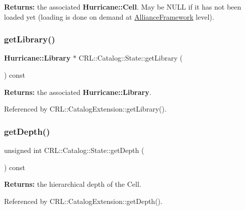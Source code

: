 {\bfseries Returns\+:} the associated \textbf{ Hurricane\+::\+Cell}. May be N\+U\+LL if it has not been loaded yet (loading is done on demand at \mbox{\hyperlink{classCRL_1_1AllianceFramework}{Alliance\+Framework}} level). \mbox{\label{classCRL_1_1Catalog_1_1State_a89dad78f1829b1ee3177f61e2f73d6c6}} 
\subsubsection{\texorpdfstring{get\+Library()}{getLibrary()}}
{\footnotesize\ttfamily \textbf{ Hurricane\+::\+Library} $\ast$ C\+R\+L\+::\+Catalog\+::\+State\+::get\+Library (\begin{DoxyParamCaption}{ }\end{DoxyParamCaption}) const\hspace{0.3cm}{\ttfamily [inline]}}

{\bfseries Returns\+:} the associated \textbf{ Hurricane\+::\+Library}. 

Referenced by C\+R\+L\+::\+Catalog\+Extension\+::get\+Library().

\mbox{\label{classCRL_1_1Catalog_1_1State_a0232ad6dcfda1e2801f788deaad83e08}} 
\subsubsection{\texorpdfstring{get\+Depth()}{getDepth()}}
{\footnotesize\ttfamily unsigned int C\+R\+L\+::\+Catalog\+::\+State\+::get\+Depth (\begin{DoxyParamCaption}{ }\end{DoxyParamCaption}) const\hspace{0.3cm}{\ttfamily [inline]}}

{\bfseries Returns\+:} the hierarchical depth of the Cell. 

Referenced by C\+R\+L\+::\+Catalog\+Extension\+::get\+Depth().

\mbox{\label{classCRL_1_1Catalog_1_1State_a41fde67f1b88de06cae113a0d8108f25}} 
